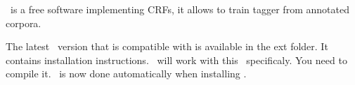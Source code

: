 \documentclass[manual-fr.tex]{subfiles}
\begin{document}
\WapitiCite\ is a free software implementing CRFs, it allows to train tagger from annotated corpora.

The latest \Wapiti\ version that is compatible with \SEM is available in the ext folder. It contains installation instructions. \SEM\ will work with this \Wapiti\ specificaly. You need to compile it. \Wapiti\ is now done automatically when installing \SEM.
\end{document}
